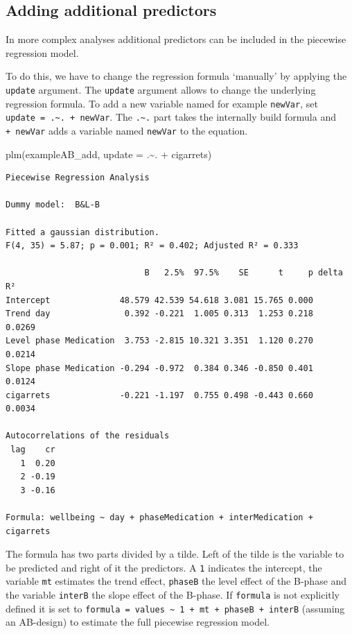\documentclass[
]{book}
\newenvironment{Shaded}{\begin{snugshade}}{\end{snugshade}}
\newcommand{\AttributeTok}[1]{\textcolor[rgb]{0.77,0.63,0.00}{#1}}
\newcommand{\FunctionTok}[1]{\textcolor[rgb]{0.00,0.00,0.00}{#1}}
\newcommand{\NormalTok}[1]{#1}
\newcommand{\SpecialCharTok}[1]{\textcolor[rgb]{0.00,0.00,0.00}{#1}}
\begin{document}
\hypertarget{adding-additional-predictors}{%
\subsection{Adding additional predictors}\label{adding-additional-predictors}}

In more complex analyses additional predictors can be included in the piecewise regression model.

To do this, we have to change the regression formula `manually' by applying the \texttt{update} argument. The \texttt{update} argument allows to change the underlying regression formula. To add a new variable named for example \texttt{newVar}, set \texttt{update\ =\ .\textasciitilde{}.\ +\ newVar}. The \texttt{.\textasciitilde{}.} part takes the internally build formula and \texttt{+\ newVar} adds a variable named \texttt{newVar} to the equation.

\begin{Shaded}
\begin{Highlighting}[]
\FunctionTok{plm}\NormalTok{(exampleAB\_add, }\AttributeTok{update =}\NormalTok{ .}\SpecialCharTok{\textasciitilde{}}\NormalTok{. }\SpecialCharTok{+}\NormalTok{ cigarrets)}
\end{Highlighting}
\end{Shaded}

\begin{verbatim}
Piecewise Regression Analysis

Dummy model:  B&L-B 

Fitted a gaussian distribution.
F(4, 35) = 5.87; p = 0.001; R² = 0.402; Adjusted R² = 0.333

                            B   2.5%  97.5%    SE      t     p delta R²
Intercept              48.579 42.539 54.618 3.081 15.765 0.000         
Trend day               0.392 -0.221  1.005 0.313  1.253 0.218   0.0269
Level phase Medication  3.753 -2.815 10.321 3.351  1.120 0.270   0.0214
Slope phase Medication -0.294 -0.972  0.384 0.346 -0.850 0.401   0.0124
cigarrets              -0.221 -1.197  0.755 0.498 -0.443 0.660   0.0034

Autocorrelations of the residuals
 lag    cr
   1  0.20
   2 -0.19
   3 -0.16

Formula: wellbeing ~ day + phaseMedication + interMedication + cigarrets
\end{verbatim}

The formula has two parts divided by a tilde. Left of the tilde is the variable to be predicted and right of it the predictors. A \texttt{1} indicates the intercept, the variable \texttt{mt} estimates the trend effect, \texttt{phaseB} the level effect of the B-phase and the variable \texttt{interB} the slope effect of the B-phase. If \texttt{formula} is not explicitly defined it is set to \texttt{formula\ =\ values\ \textasciitilde{}\ 1\ +\ mt\ +\ phaseB\ +\ interB} (assuming an AB-design) to estimate the full piecewise regression model.
\end{document}
